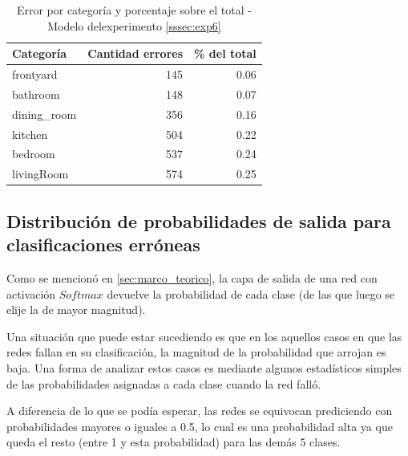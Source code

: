 \begin{table}[h!]
	\centering
	\begin{tabular}{| l | r | r |}
		\toprule
		Categoría &    Cantidad errores &     \% del total \\
		\midrule
		frontyard &  145 &  0.06 \\
		bathroom &  148 &  0.07 \\
		dining\_room &  356 &  0.16 \\
		kitchen &  504 &  0.22 \\
		bedroom &  537 &  0.24 \\
		livingRoom &  574 &  0.25 \\
		\bottomrule
	\end{tabular}
	\caption{Error por categoría y porcentaje sobre el total - Modelo delexperimento \ref{sssec:exp6}}
	\label{conclusiones:error_analysis:exp6}
\end{table}

\subsection{Distribución de probabilidades de salida para clasificaciones erróneas}
Como se mencionó en \ref{sec:marco_teorico}, la capa de salida de una red con activación \(Softmax\) devuelve la probabilidad de cada clase (de las que luego se elije la de mayor magnitud). 

Una situación que puede estar sucediendo es que en los aquellos casos en que las redes fallan en su clasificación, la magnitud de la probabilidad que arrojan es baja. Una forma de analizar estos casos es mediante algunos estadísticos simples de las probabilidades asignadas a cada clase cuando la red falló. 

A diferencia de lo que se podía esperar, las redes se equivocan prediciendo con probabilidades mayores o iguales a 0.5, lo cual es una probabilidad alta ya que queda el resto (entre 1 y esta probabilidad) para las demás 5 clases. 
   
